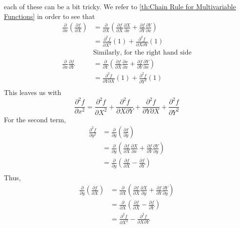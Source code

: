 each of these can be a bit tricky. We refer to \ref{th:Chain Rule for Multivariable
Functions} in order to see that 
\begin{align*}
    \frac{ \partial  }{ \partial x } \left( \frac{ \partial f }{ \partial X } \right)  &=
    \frac{ \partial  }{ \partial X } \left( \frac{ \partial f}{ \partial X } \frac{
    \partial X }{ \partial x } + \frac{ \partial f }{ \partial Y } \frac{ \partial Y }{
    \partial x }  \right) \\
     &= \frac{ \partial ^2 f }{ \partial X^2 } \left( 1\right) + \frac{ \partial ^2 f }{
     \partial X \partial Y } \left( 1\right)  \\ 
      &\text{Similarly, for the right hand side}   \\ 
      \frac{ \partial  }{ \partial x } \frac{ \partial f }{ \partial Y }   &= \frac{
      \partial  }{ \partial Y } \left( \frac{ \partial f }{ \partial X } \frac{ \partial x
  }{ \partial x } + \frac{ \partial f }{ \partial Y } \frac{ \partial Y }{ \partial x } \right)  \\
   &= \frac{ \partial ^2 f }{ \partial Y \partial X } \left( 1\right)  + \frac{ \partial^2
   f }{ \partial Y^2 } \left( 1\right)  \\ 
\end{align*}
This leaves us with  
\[
\frac{ \partial ^2 f }{ \partial x^2  } = \frac{ \partial ^2f }{ \partial X^2 } +
\frac{ \partial ^2f }{ \partial X \partial Y } + \frac{ \partial ^2f }{ \partial Y
\partial X } + \frac{ \partial ^2f }{ \partial Y^2 }     
\]
For the second term, 
\begin{align*}
    \frac{ \partial ^2 f }{ \partial y^2  } &= \frac{ \partial  }{ \partial y } \left(
    \frac{ \partial f }{ \partial y } \right) \\
     &= \frac{ \partial  }{ \partial y } \left( \frac{ \partial f }{ \partial X } \frac{
     \partial X }{ \partial x } + \frac{ \partial f }{ \partial Y } \frac{ \partial Y }{
     \partial y } \right)  \\ 
     &= \frac{ \partial  }{ \partial y } \left( \frac{ \partial f }{ \partial X } - \frac{
     \partial f }{ \partial Y } \right)  \\ 
\end{align*}
Thus, 
\begin{align*}
    \frac{ \partial  }{ \partial y } \left( \frac{ \partial f }{ \partial X } \right) &=
    \frac{ \partial  }{ \partial X } \left( \frac{ \partial f }{ \partial X } \frac{
    \partial X }{ \partial y } + \frac{ \partial f }{ \partial Y } \frac{ \partial Y }{
    \partial y } \right) \\
     &= \frac{ \partial  }{ \partial X } \left( \frac{ \partial f }{ \partial X } - \frac{
     \partial f }{ \partial Y }  \right)  \\ 
     &= \frac{ \partial ^2 f }{ \partial X^2 } - \frac{ \partial ^2 f }{ \partial X
     \partial Y }  \\ 
\end{align*}

